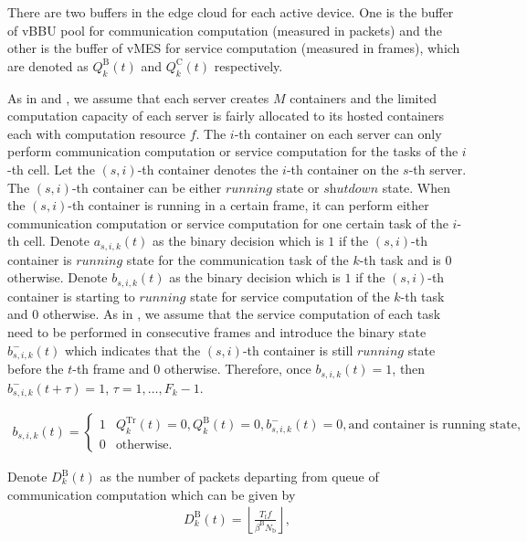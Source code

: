 There are two buffers in the edge cloud for each active device. One is the buffer of vBBU pool for communication computation (measured in packets) and the other is the buffer of vMES for service computation (measured in frames), which are denoted as $Q_{k}^{\mathrm{B}}(t)$ and $Q_{k}^{\mathrm{C}}(t)$ respectively.

As in  and , we assume that each server creates $M$ containers and the limited computation capacity of each server is fairly allocated to its hosted containers each with computation resource $f$. The $i$-th container on each server can only perform communication computation or service computation for the tasks of the $i$-th cell. Let the $(s,i)$-th container denotes the $i$-th container on the $s$-th server. The $(s,i)$-th container can be either $\textit{running}$ state or $\textit{shutdown}$ state. When the $(s,i)$-th container is running in a certain frame, it can perform either communication computation or service computation for one certain task of the $i$-th cell. Denote $a_{s,i,k}(t)$ as the binary decision which is $1$ if the $(s,i)$-th container is $\textit{running}$ state for the communication task of the $k$-th task and is $0$ otherwise. Denote $b_{s,i,k}(t)$ as the binary decision which is $1$ if the $(s,i)$-th container is starting to $\textit{running}$ state for service computation of the $k$-th task and $0$ otherwise. As in \cite{}, we assume that the service computation of each task need to be performed in consecutive frames and introduce the binary state $b_{s,i,k}^{-}(t)$ which indicates that the $(s,i)$-th container is still $\textit{running}$ state before the $t$-th frame and $0$ otherwise. Therefore, once $b_{s,i,k}(t)=1$, then $b_{s,i,k}^{-}(t+\tau)=1$, $\tau=1,\ldots,F_{k}-1$.

\begin{align}
    b_{s,i,k}(t)=
    \begin{cases}
        1 &Q_{k}^{\mathrm{Tr}}(t)=0,Q_{k}^{\mathrm{B}}(t)=0,b_{s,i,k}^{-}(t)=0,\text{and container is running state,}\\
        0 &\text{otherwise}.
    \end{cases}
\end{align}

Denote $D_{k}^{\mathrm{B}}(t)$ as the number of packets departing from queue of communication computation which can be given by
\begin{align}
    D_{k}^{\mathrm{B}}(t)=\left\lfloor\frac{T_{\mathrm{f}}f}{\beta^{\mathrm{B}}N_{\mathrm{b}}}\right\rfloor,
\end{align}

